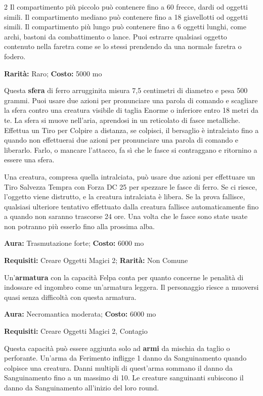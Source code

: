 \begin{multicols}{2}
Il compartimento più piccolo può contenere fino a 60 frecce, dardi od oggetti simili. Il compartimento mediano può contenere fino a 18 giavellotti od oggetti simili. Il compartimento più lungo può contenere fino a 6 oggetti lunghi, come archi, bastoni da combattimento o lance. Puoi estrarre qualsiasi oggetto contenuto nella faretra come se lo stessi prendendo da una normale faretra o fodero.


\textbf{Rarità:} Raro; \textbf{Costo:} 5000 mo

Questa \textbf{sfera} di ferro arrugginita misura 7,5 centimetri di diametro e pesa 500 grammi. Puoi usare due azioni per pronunciare una parola di comando e scagliare la sfera contro una creatura visibile di taglia Enorme o inferiore entro 18 metri da te. La sfera si muove nell'aria, aprendosi in un reticolato di fasce metalliche. Effettua un Tiro per Colpire a distanza, se colpisci, il bersaglio è intralciato fino a quando non effettuerai due azioni per pronunciare una parola di comando e liberarlo. Farlo, o mancare l'attacco, fa sì che le fasce si contraggano e ritornino a essere una sfera.

Una creatura, compresa quella intralciata, può usare due azioni per effettuare un Tiro Salvezza Tempra con Forza DC 25 per spezzare le fasce di ferro. Se ci riesce, l'oggetto viene distrutto, e la creatura intralciata è libera. Se la prova fallisce, qualsiasi ulteriore tentativo effettuato dalla creatura fallisce automaticamente fino a quando non saranno trascorse 24 ore. Una volta che le fasce sono state usate non potranno più esserlo fino alla prossima alba.


\textbf{Aura:} Trasmutazione forte; \textbf{Costo:} 6000 mo

\textbf{Requisiti:} Creare Oggetti Magici 2; \textbf{Rarità:} Non Comune

Un'\textbf{armatura} con la capacità Felpa conta per quanto concerne le penalità di indossare ed ingombro come un'armatura leggera. Il personaggio riesce a muoversi quasi senza difficoltà con questa armatura.


\textbf{Aura:} Necromantica moderata; \textbf{Costo:} 6000 mo

\textbf{Requisiti:} Creare Oggetti Magici 2, Contagio

Questa capacità può essere aggiunta solo ad \textbf{armi} da mischia da taglio o perforante. Un'arma da Ferimento infligge 1 danno da Sanguinamento quando colpisce una creatura. Danni multipli di quest'arma sommano il danno da Sanguinamento fino a un massimo di 10.
Le creature sanguinanti subiscono il danno da Sanguinamento all'inizio del loro round.


\end{multicols}
